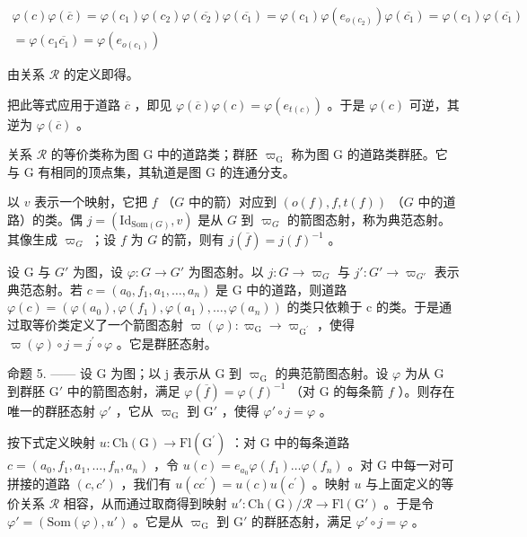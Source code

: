 \[
\begin{array}{c} \varphi (c) \varphi (\overline {{c}}) = \varphi (c _ {1}) \varphi (c _ {2}) \varphi (\overline {{c _ {2}}}) \varphi (\overline {{c _ {1}}}) = \varphi (c _ {1}) \varphi (e _ {o (c _ {2})}) \varphi (\overline {{c _ {1}}}) = \varphi (c _ {1}) \varphi (\overline {{c _ {1}}}) \\ = \varphi (c _ {1} \overline {{c _ {1}}}) = \varphi (e _ {o (c _ {1})}) \end{array}
\]

由关系 \(\mathcal{R}\) 的定义即得。

把此等式应用于道路 \(\overline{c}\) ，即见 \(\varphi(\overline{c})\varphi(c)=\varphi(e_{t(c)})\) 。于是 \(\varphi(c)\) 可逆，其逆为 \(\varphi(\overline{c})\) 。

关系 \(\mathcal{R}\) 的等价类称为图 G 中的道路类；群胚 \(\varpi_{\mathrm{G}}\) 称为图 G 的道路类群胚。它与 G 有相同的顶点集，其轨道是图 G 的连通分支。

以 \(v\) 表示一个映射，它把 \(f\) （\(G\) 中的箭）对应到 \((o(f), f, t(f))\) （\(G\) 中的道路）的类。偶 \(j = (\mathrm{Id}_{\mathrm{Som}(G)}, v)\) 是从 \(G\) 到 \(\varpi_G\) 的箭图态射，称为典范态射。其像生成 \(\varpi_G\) ；设 \(f\) 为 \(G\) 的箭，则有 \(j(\overline{f}) = j(f)^{-1}\) 。

设 G 与 \(G'\) 为图，设 \(\varphi\colon G \to G'\) 为图态射。以 \(j\colon G \to \varpi_{G}\) 与 \(j'\colon G' \to \varpi_{G'}\) 表示典范态射。若 \(c = (a_0, f_1, a_1, \ldots, a_n)\) 是 G 中的道路，则道路 \(\varphi(c) = (\varphi(a_0), \varphi(f_1), \varphi(a_1), \ldots, \varphi(a_n))\) 的类只依赖于 c 的类。于是通过取等价类定义了一个箭图态射 \(\varpi(\varphi)\colon\varpi_{\mathrm{G}}\to\varpi_{\mathrm{G}^{\prime}}\) ，使得 \(\varpi(\varphi)\circ j=j^{\prime}\circ\varphi\) 。它是群胚态射。

命题 5. —— 设 G 为图；以 j 表示从 G 到 \(\varpi_{\mathrm{G}}\) 的典范箭图态射。设 \(\varphi\) 为从 G 到群胚 \(\mathrm{G}'\) 中的箭图态射，满足 \(\varphi(\overline{f}) = \varphi(f)^{-1}\) （对 G 的每条箭 \(f\) ）。则存在唯一的群胚态射 \(\varphi'\) ，它从 \(\varpi_{\mathrm{G}}\) 到 \(\mathrm{G}'\) ，使得 \(\varphi' \circ j = \varphi\) 。

按下式定义映射 \(u\colon \mathrm{Ch}(\mathrm{G})\to \mathrm{Fl}(\mathrm{G}^{\prime})\) ：对 G 中的每条道路 \(c = (a_0,f_1,a_1,\ldots ,f_n,a_n)\) ，令 \(u(c) = e_{a_0}\varphi (f_1)\dots \varphi (f_n)\) 。对 G 中每一对可拼接的道路 \((c,c')\) ，我们有 \(u(cc^{\prime}) = u(c)u(c^{\prime})\) 。映射 \(u\) 与上面定义的等价关系 \(\mathcal{R}\) 相容，从而通过取商得到映射 \(u'\colon \mathrm{Ch}(\mathrm{G}) / \mathcal{R}\to \mathrm{Fl}(\mathrm{G}')\) 。于是令 \(\varphi ' = (\mathrm{Som}(\varphi),u')\) 。它是从 \(\varpi_{\mathrm{G}}\) 到 \(\mathrm{G}'\) 的群胚态射，满足 \(\varphi '\circ j = \varphi\) 。

